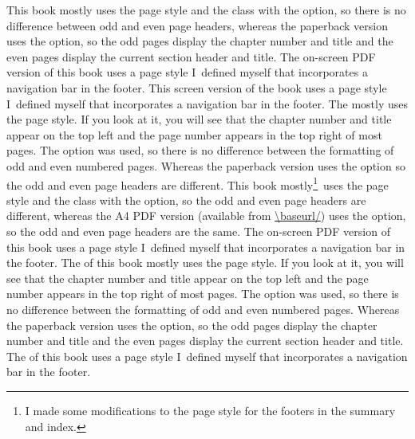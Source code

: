 \casemedia
 {%
  This book mostly uses the  page style and the
   class with the 
   option, so there is no difference between odd and
  even page headers, whereas the paperback version uses the
   option, so the odd pages display the chapter
   number and title and the even pages display the current section
   header and title. The on-screen PDF version of this book uses a page style 
  I~defined myself that incorporates a navigation bar in the footer.
 }%
 {%
   This screen version of the book uses a page style I~defined myself
   that incorporates a navigation bar in the footer. 
   The  mostly uses
   the  page style. If you look at it, you
   will see that the chapter number and title appear on the top left and
   the page number appears in the top right of most pages.  The 
    option was used, so there is no difference between
   the formatting of odd and even numbered pages. Whereas the paperback
   version uses the  option so the odd and even page
   headers are different.
 }
 {%
  This book mostly\footnote{I made some modifications to the page style 
  for the footers in the summary and index.}\ uses the  
  page style and the  class with the 
   option, so the odd and even page headers are
  different, whereas the A4 PDF version (available from
  \url{\baseurl/}) uses the  option, so the odd and
  even page headers are the same.
  The on-screen PDF version of this book uses a page style 
  I~defined myself that incorporates a navigation bar in the footer.
 }
 {%
   The  of this book
   mostly uses the  page style.  If you look at it, you
   will see that the chapter number and title appear on the top left and
   the page number appears in the top right of most pages.  The 
    option was used, so there is no difference between
   the formatting of odd and even numbered pages. Whereas the paperback
   version uses the  option, so the odd pages display the chapter
   number and title and the even pages display the current section
   header and title.
   The  of this book
   uses a page style I~defined myself that incorporates a navigation bar
   in the footer. 
 }

